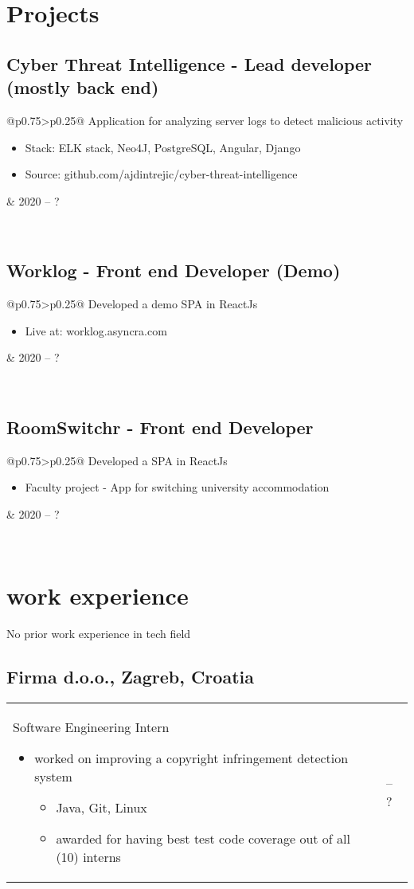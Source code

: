 \documentclass[a4paper]{article}
\makeatletter
\newlength{\tablewidth}
\newenvironment{period}[2]{%
\newcommand{\sarma}{#2}%
\setlength{\tablewidth}{\linewidth}
\addtolength{\tablewidth}{-2\tabcolsep}
\begin{tabular}{@{}p{0.75\tablewidth}>{\raggedleft\arraybackslash}p{0.25\tablewidth}@{}}%
#1 \newline
\begin{itemize}
}{%
\end{itemize} & \sarma \\%
\end{tabular}\\
}
\makeatother
\begin{document}
\section{Projects}

\subsection{Cyber Threat Intelligence - Lead developer (mostly back end)}
\begin{period}{Application for analyzing server logs to detect malicious activity}{2020 -- ?}
\item Stack: ELK stack, Neo4J, PostgreSQL, Angular, Django
\item Source: github.com/ajdintrejic/cyber-threat-intelligence
\end{period}

\subsection{Worklog - Front end Developer (Demo)}
\begin{period}{Developed a demo SPA in ReactJs}{2020}
\item Live at: worklog.asyncra.com
\end{period}


\subsection{RoomSwitchr - Front end Developer}
\begin{period}{Developed a SPA in ReactJs }{2020}
\item Faculty project - App for switching university accommodation 
\end{period}

\iffalse

\section{work experience}
No prior work experience in tech field\\

\subsection{Firma d.o.o., Zagreb, Croatia}
\begin{period}{Software Engineering Intern}{Jun 2012 -- Sep 2012}
    \item 
        worked on improving a copyright infringement detection system
        \begin{itemize}
            \item Java, Git, Linux
            \item awarded for having best test code coverage out of all (10) interns
        \end{itemize}
\end{period}
\end{document}

